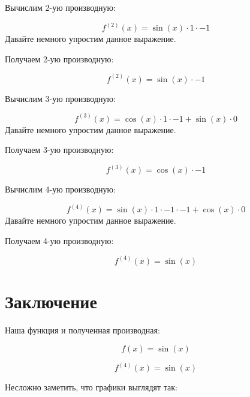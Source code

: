 \documentclass[12pt,a4paper]{extreport}
\begin{document}
Вычислим 2-ую производную:

\begin{dmath*}
f^{(2)}(x) = \sin(x) \cdot 1 \cdot -1
\end{dmath*}
Давайте немного упростим данное выражение.


Получаем 2-ую производную:

\begin{dmath*}
f^{(2)}(x) = \sin(x) \cdot -1
\end{dmath*}

Вычислим 3-ую производную:

\begin{dmath*}
f^{(3)}(x) = \cos(x) \cdot 1 \cdot -1 + \sin(x) \cdot 0
\end{dmath*}
Давайте немного упростим данное выражение.


Получаем 3-ую производную:

\begin{dmath*}
f^{(3)}(x) = \cos(x) \cdot -1
\end{dmath*}

Вычислим 4-ую производную:

\begin{dmath*}
f^{(4)}(x) = \sin(x) \cdot 1 \cdot -1 \cdot -1 + \cos(x) \cdot 0
\end{dmath*}
Давайте немного упростим данное выражение.


Получаем 4-ую производную:

\begin{dmath*}
f^{(4)}(x) = \sin(x)
\end{dmath*}
\section{Заключение}
Наша функция и полученная производная:


\begin{dmath*}
f(x) = \sin(x)
\end{dmath*}

\begin{dmath*}
f^{(4)}(x) = \sin(x)
\end{dmath*}


Несложно заметить, что графики выглядят так:
\end{document}
